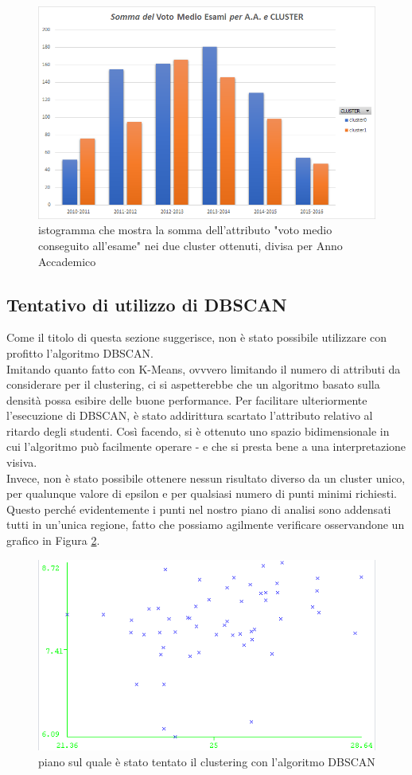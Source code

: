         \begin{figure}
            \centering
            \caption{istogramma che mostra la somma dell'attributo "voto medio conseguito all'esame" nei due cluster ottenuti, divisa per Anno Accademico}
            \label{voto}
            \includegraphics[scale=0.5]{../cluster/min_kmeans_2cl_voto.png}
        \end{figure}

    \subsection{Tentativo di utilizzo di DBSCAN}

    Come il titolo di questa sezione suggerisce, non è stato possibile utilizzare con profitto l'algoritmo DBSCAN. \\

    Imitando quanto fatto con K-Means, ovvvero limitando il numero di attributi da considerare per il clustering, ci si aspetterebbe che un algoritmo basato sulla densità possa esibire delle buone performance. Per facilitare ulteriormente l'esecuzione di DBSCAN, è stato addirittura scartato l'attributo relativo al ritardo degli studenti. Così facendo, si è ottenuto uno spazio bidimensionale in cui l'algoritmo può facilmente operare - e che si presta bene a una interpretazione visiva. \\

    Invece, non è stato possibile ottenere nessun risultato diverso da un cluster unico, per qualunque valore di epsilon e per qualsiasi numero di punti minimi richiesti. Questo perché evidentemente i punti nel nostro piano di analisi sono addensati tutti in un'unica regione, fatto che possiamo agilmente verificare osservandone un grafico in Figura \ref{dbscan}.

    \begin{figure}
        \centering
        \caption{piano sul quale è stato tentato il clustering con l'algoritmo DBSCAN}
        \label{dbscan}
        \includegraphics[scale=0.85]{../cluster/dbscan.png}
    \end{figure}